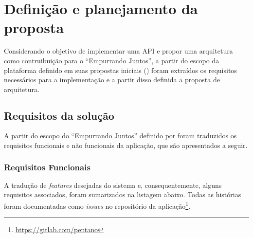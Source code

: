 \chapter{Definição e planejamento da proposta} \label{cap:proposta}

 Considerando o objetivo de implementar uma API e propor uma arquitetura como contruibuição
 para o ``Empurrando Juntos'', a partir do escopo da plataforma 
 definido em suas propostas iniciais () 
 foram extraídos os requisitos necessários para a implementação e
 a partir disso definida a proposta de arquitetura.

\section{Requisitos da solução} \label{requirements}

    A partir do escopo do ``Empurrando Juntos'' definido por 
    foram traduzidos os requisitos funcionais e não funcionais da aplicação,
    que são apresentados a seguir.

    \subsection*{Requisitos Funcionais} \label{functional_requirements}

    A tradução de \textit{features} desejadas do sistema e,
    consequentemente, alguns requisitos associados, 
    foram sumarizados na listagem abaixo. Todas as histórias foram documentadas 
    como \textit{issues} no repositório
    da aplicação\footnote{\href{https://gitlab.com/pentano}{https://gitlab.com/pentano}}.

